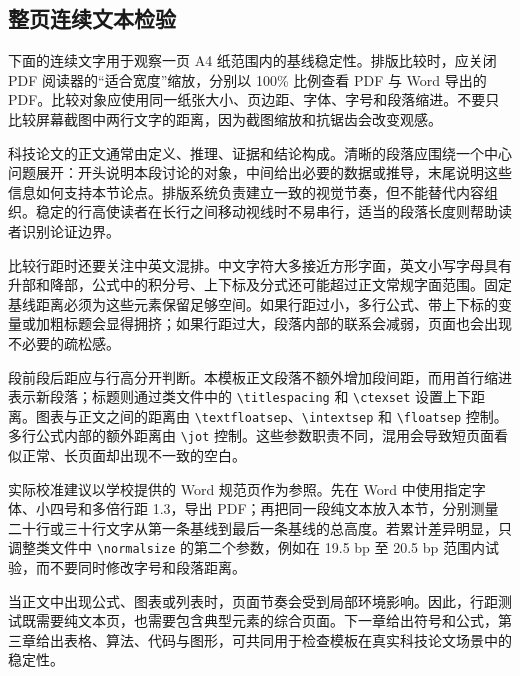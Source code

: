 \subsection{整页连续文本检验}
下面的连续文字用于观察一页 A4 纸范围内的基线稳定性。排版比较时，应关闭 PDF 阅读器的“适合宽度”缩放，分别以 100\% 比例查看 PDF 与 Word 导出的 PDF。比较对象应使用同一纸张大小、页边距、字体、字号和段落缩进。不要只比较屏幕截图中两行文字的距离，因为截图缩放和抗锯齿会改变观感。

科技论文的正文通常由定义、推理、证据和结论构成。清晰的段落应围绕一个中心问题展开：开头说明本段讨论的对象，中间给出必要的数据或推导，末尾说明这些信息如何支持本节论点。排版系统负责建立一致的视觉节奏，但不能替代内容组织。稳定的行高使读者在长行之间移动视线时不易串行，适当的段落长度则帮助读者识别论证边界。

比较行距时还要关注中英文混排。中文字符大多接近方形字面，英文小写字母具有升部和降部，公式中的积分号、上下标及分式还可能超过正文常规字面范围。固定基线距离必须为这些元素保留足够空间。如果行距过小，多行公式、带上下标的变量或加粗标题会显得拥挤；如果行距过大，段落内部的联系会减弱，页面也会出现不必要的疏松感。

段前段后距应与行高分开判断。本模板正文段落不额外增加段间距，而用首行缩进表示新段落；标题则通过类文件中的 \verb|\titlespacing| 和 \verb|\ctexset| 设置上下距离。图表与正文之间的距离由 \verb|\textfloatsep|、\verb|\intextsep| 和 \verb|\floatsep| 控制。多行公式内部的额外距离由 \verb|\jot| 控制。这些参数职责不同，混用会导致短页面看似正常、长页面却出现不一致的空白。

实际校准建议以学校提供的 Word 规范页作为参照。先在 Word 中使用指定字体、小四号和多倍行距 1.3，导出 PDF；再把同一段纯文本放入本节，分别测量二十行或三十行文字从第一条基线到最后一条基线的总高度。若累计差异明显，只调整类文件中 \verb|\normalsize| 的第二个参数，例如在 19.5 bp 至 20.5 bp 范围内试验，而不要同时修改字号和段落距离。

当正文中出现公式、图表或列表时，页面节奏会受到局部环境影响。因此，行距测试既需要纯文本页，也需要包含典型元素的综合页面。下一章给出符号和公式，第三章给出表格、算法、代码与图形，可共同用于检查模板在真实科技论文场景中的稳定性。
